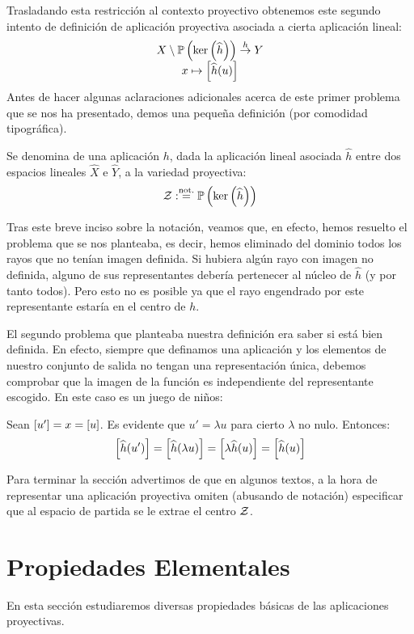 Trasladando esta restricción al contexto proyectivo obtenemos este segundo intento de definición de aplicación proyectiva asociada a cierta aplicación lineal:
\[\begin{array}{c}
X\setminus\mathbb{P}\left(\ker\left(\widehat{h}\right)\right)\stackrel{h}{\to}Y\\
x\mapsto\left [ \widehat{h}(u) \right ]
\end{array}\]
Antes de hacer algunas aclaraciones adicionales acerca de este primer problema que se nos ha presentado, demos una pequeña definición (por comodidad tipográfica).
\begin{defi}[Centro]
	\label{C4_def_centro}
	Se denomina  de una aplicación $h$, dada la aplicación lineal asociada $\widehat{h}$ entre dos espacios lineales $\widehat{X}$ e $\widehat{Y}$, a la variedad proyectiva:
	\[\mathcal{Z}:\stackrel{\textrm{not.}}{=}\mathbb{P}\left(\ker\left(\widehat{h}\right)\right)\]
\end{defi}
Tras este breve inciso sobre la notación, veamos que, en efecto, hemos resuelto el problema que se nos planteaba, es decir, hemos eliminado del dominio todos los rayos que no tenían imagen definida. Si hubiera algún rayo con imagen no definida, alguno de sus representantes debería pertenecer al núcleo de $\widehat{h}$ (y por tanto todos). Pero esto no es posible ya que el rayo engendrado por este representante estaría en el centro de $h$.

El segundo problema que planteaba nuestra definición era saber si está bien definida. En efecto, siempre que definamos una aplicación y los elementos de nuestro conjunto de salida no tengan una representación única, debemos comprobar que la imagen de la función es independiente del representante escogido. En este caso es un juego de niños:

Sean $\left [ u' \right ]=x=\left [ u \right ]$. Es evidente que $u' = \lambda u$ para cierto $\lambda$ no nulo. Entonces:
\[\left [ \widehat{h}(u') \right ]=\left [ \widehat{h}(\lambda u) \right ]=\left [ \lambda\widehat{h}(u) \right ]=\left [ \widehat{h}(u) \right ]\]

Para terminar la sección advertimos de que en algunos textos, a la hora de representar una aplicación proyectiva omiten (abusando de notación) especificar que al espacio de partida se le extrae el centro $\mathcal{Z}$. 
\section{Propiedades Elementales}
En esta sección estudiaremos diversas propiedades básicas de las aplicaciones proyectivas.

